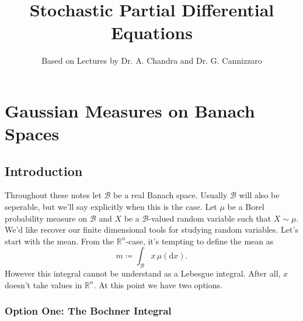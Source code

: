\documentclass[fontsize=12pt, DIV=10]{scrreprt}
\title{Stochastic Partial Differential Equations}
\author{Based on Lectures by Dr. A. Chandra and Dr. G. Cannizzaro}
\theoremstyle{remark}
\newcommand{\defeq}{\coloneqq}
\newcommand{\R}{\mathbb R}
\newcommand{\calB}{\mathcal B}
\newcommand{\dif}[1]{\text{d} #1}
\begin{document}
\maketitle

\tableofcontents

\chapter{Gaussian Measures on Banach Spaces}

\section{Introduction}

Throughout these notes let $\calB$ be a real Banach space. Usually $\calB$ will also be seperable, but we'll say explicitly when this is the case. Let $\mu$ be a Borel probability measure on $\calB$ and $X$ be a $\calB$-valued random variable such that $X \sim \mu$. We'd like recover our finite dimensional tools for studying random variables. Let's start with the mean. From the $\R^n$-case, it's tempting to define the mean as
\begin{equation}
	m \defeq \int_{\calB} x \, \mu(\dif x).
\end{equation}
However this integral cannot be understand as a Lebesgue integral. After all, $x$ doesn't take values in $\R^n$. At this point we have two options.

\subsection{Option One: The Bochner Integral}
\end{document}
